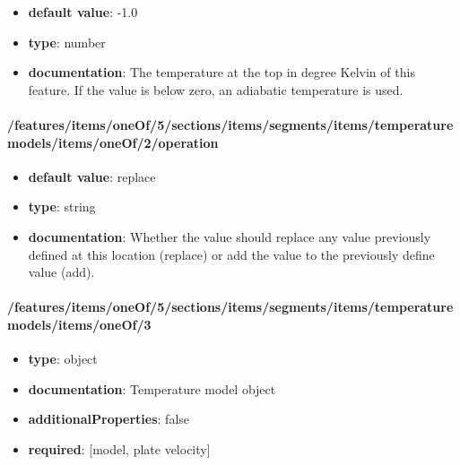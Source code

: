 \begin{itemize}\item {\bf default value}: -1.0
\item {\bf type}: number
\item {\bf documentation}: The temperature at the top in degree Kelvin of this feature. If the value is below zero, an adiabatic temperature is used.
\end{itemize}\paragraph{/features/items/oneOf/5/sections/items/segments/items/temperature models/items/oneOf/2/operation}
\begin{itemize}\item {\bf default value}: replace
\item {\bf type}: string
\item {\bf documentation}: Whether the value should replace any value previously defined at this location (replace) or add the value to the previously define value (add).
\end{itemize}\paragraph{/features/items/oneOf/5/sections/items/segments/items/temperature models/items/oneOf/3}
\begin{itemize}\item {\bf type}: object
\item {\bf documentation}: Temperature model object
\item {\bf additionalProperties}: false
\item {\bf required}: [model, plate velocity]\end{itemize}
